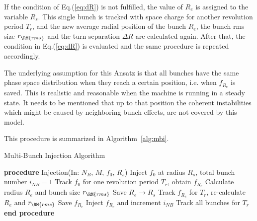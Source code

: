 \documentclass[aps,prstab,onecolumn,superscriptaddress,showpacs]{revtex4}
\begin{document}
If the condition of Eq.(\ref{eq:dR}) is not fulfilled, the value of $R_e$ is assigned to the variable $R_s$. 
This single bunch is tracked with space charge for another revolution period $T_{r}$, and the new average radial position of the bunch $R_e$, 
the bunch rms size $r_{\RM{rms}}$ and the turn separation $\Delta R$ are calculated again. 
After that, the condition in Eq.(\ref{eq:dR}) is evaluated and the same procedure is repeated accordingly.

The underlying assumption for this Ansatz is that all bunches have the same phase space distribution when they reach a certain position, 
i.e. when $f_{R_{e}}$ is saved.
This is realistic and reasonable when the machine is running in a steady state. 
It needs to be mentioned that up to that position the coherent instabilities which might be caused by neighboring bunch effects, 
are not covered by this model.

This procedure is summarized in Algorithm~\ref{alg:mbi}.

\begin{algorithm}
  \caption{Multi-Bunch Injection Algorithm} 
  \label{alg:mbi}
  \begin{algorithmic}[1]
    \STATE \textbf{procedure} Injection(In: $N_B$, $M$, $f_0$, $R_s$) 
    \STATE Inject $f_0$ at radius $R_s$, total bunch number $i_{NB}=1$
    \STATE Track $f_0$ for one revolution period $T_{r}$, obtain $f_{R_{e}}$
    \STATE Calculate radius $R_e$ and bunch size $r_{\RM{rms}}$
    \STATE     Save $ R_e \rightarrow R_s$
    \STATE     Track $f_{R_{e}}$ for $T_{r}$, re-calculate $R_e$ and $r_{\RM{rms}}$
    \ENDWHILE
    \STATE Save $f_{R_{e}}$
    \STATE Inject $f_{R_{e}} \text{ and increment } i_{NB}$
    \STATE Track all bunches for $T_{r}$
    \ENDWHILE
    \STATE \textbf{end procedure}
  \end{algorithmic}
\end{algorithm}
\end{document}
